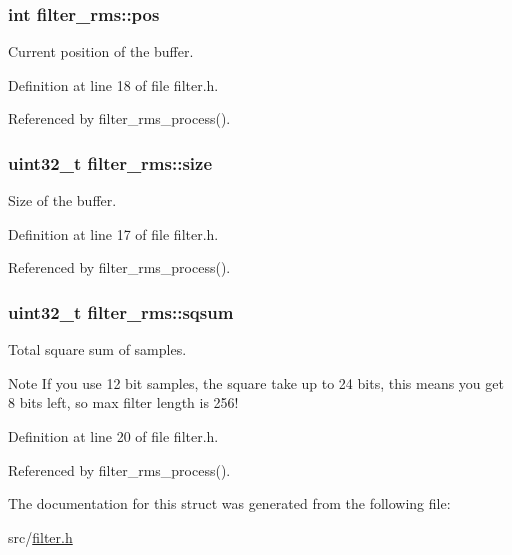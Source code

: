 \subsubsection[{pos}]{\setlength{\rightskip}{0pt plus 5cm}int filter\+\_\+rms\+::pos}\label{structfilter__rms_a85d467406ed373c2ad1a134860fd24bd}


Current position of the buffer. 



Definition at line 18 of file filter.\+h.



Referenced by filter\+\_\+rms\+\_\+process().

\hypertarget{structfilter__rms_a8581be35641ea200e6bf23ce48f76196}{}
\subsubsection[{size}]{\setlength{\rightskip}{0pt plus 5cm}uint32\+\_\+t filter\+\_\+rms\+::size}\label{structfilter__rms_a8581be35641ea200e6bf23ce48f76196}


Size of the buffer. 



Definition at line 17 of file filter.\+h.



Referenced by filter\+\_\+rms\+\_\+process().

\hypertarget{structfilter__rms_a902e6aa671bf468ba0506ef5848f51cf}{}
\subsubsection[{sqsum}]{\setlength{\rightskip}{0pt plus 5cm}uint32\+\_\+t filter\+\_\+rms\+::sqsum}\label{structfilter__rms_a902e6aa671bf468ba0506ef5848f51cf}


Total square sum of samples. 

\begin{DoxyNote}{Note}
If you use 12 bit samples, the square take up to 24 bits, this means you get 8 bits left, so max filter length is 256! 
\end{DoxyNote}


Definition at line 20 of file filter.\+h.



Referenced by filter\+\_\+rms\+\_\+process().



The documentation for this struct was generated from the following file\+:\begin{DoxyCompactItemize}
\item 
src/\hyperlink{filter_8h}{filter.\+h}\end{DoxyCompactItemize}

